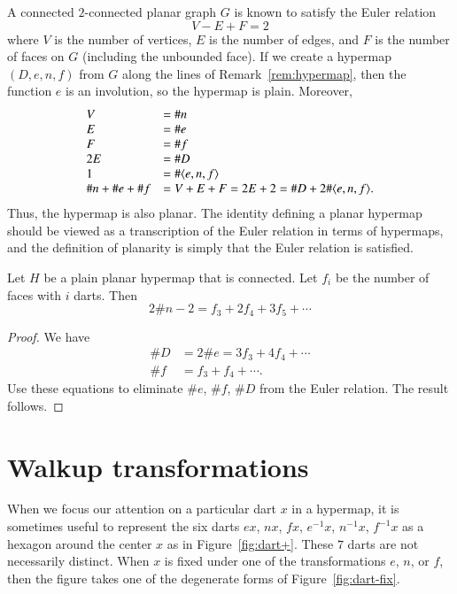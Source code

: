 \begin{remark}  A connected $2$-connected
planar graph $G$ is known to satisfy the Euler relation
    $$ V - E + F = 2$$
where $V$ is the number of vertices, $E$ is the number of edges, and
$F$ is the number of faces on $G$ (including the unbounded face). If
we create a hypermap $(D,e,n,f)$ from $G$ along the lines of
Remark~\ref{rem:hypermap}, then the function $e$ is an involution,
so the hypermap is plain. Moreover,
    $$\begin{array}{lll}
    V &= \# n\\
    E &= \# e\\
    F &= \# f\\
    2E &= \# D\\
    1 &= \#\langle e,n,f\rangle\\
    \# n + \#e + \# f &= V + E + F = 2 E + 2 = \# D + 2 \#\langle e,n,f\rangle.
    \end{array}
    $$
Thus, the hypermap is also planar.  The identity defining a planar
hypermap should be viewed as a transcription of the Euler relation
in terms of hypermaps, and the definition of planarity is simply
that the Euler relation is satisfied.
\end{remark}

\begin{lemma}  Let $H$ be a plain planar hypermap that is connected.
Let $f_i$ be the number of faces with $i$ darts.  Then
    $$2 \# n - 2 =  f_3 + 2 f_4 + 3 f_5 +\cdots$$
\end{lemma}

\begin{proof}  We have
    $$
    \begin{array}{lll}
     \# D &= 2 \# e = 3 f_3 + 4 f_4 + \cdots\\
    \# f &= f_3 + f_4 + \cdots.
    \end{array}
    $$
Use these equations to eliminate $\#e$, $\#f$, $\#D$ from the Euler
relation.  The result follows.
\end{proof}



\section{Walkup transformations}

When we focus our attention on a particular dart $x$ in a
hypermap, it is sometimes useful to represent the six darts $e x$,
$n x$, $f x$, $e^{-1} x$, $n^{-1} x$, $f^{-1} x$ as a hexagon
around the center $x$ as in Figure~\ref{fig:dart+}.  These $7$
darts are not necessarily distinct.   When $x$ is fixed under one
of the transformations $e$, $n$, or $f$, then the figure takes one
of the degenerate forms of Figure~\ref{fig:dart-fix}.

